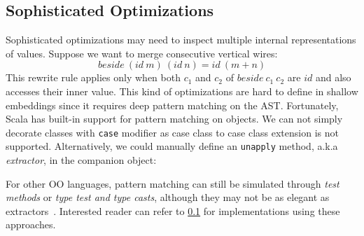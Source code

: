 \subsection{Sophisticated Optimizations}
Sophisticated optimizations may need to inspect multiple internal
representations of values.
Suppose we want to merge consecutive vertical wires:
$$
beside\ (id\ m)\ (id\ n) = id\ (m + n)
$$
This rewrite rule applies only when both $c_1$ and $c_2$ of $beside\ c_1\ c_2$
are $id$ and also accesses their inner value.
This kind of optimizations are hard to define in shallow embeddings since it
requires deep pattern matching on the AST.
Fortunately, Scala has built-in support for pattern matching on objects.
We can not simply decorate classes with \lstinline{case} modifier
as case class to case class extension is not supported.
Alternatively, we could manually define an \lstinline{unapply} method, a.k.a
\emph{extractor}, in the companion object:

For other OO languages, pattern matching can still be simulated through \emph{test methods} or \emph{type test and type casts},
although they may not be as elegant as extractors~\cite{emir2007matching}.
Interested reader can refer to \ref{} for implementations using these approaches.


